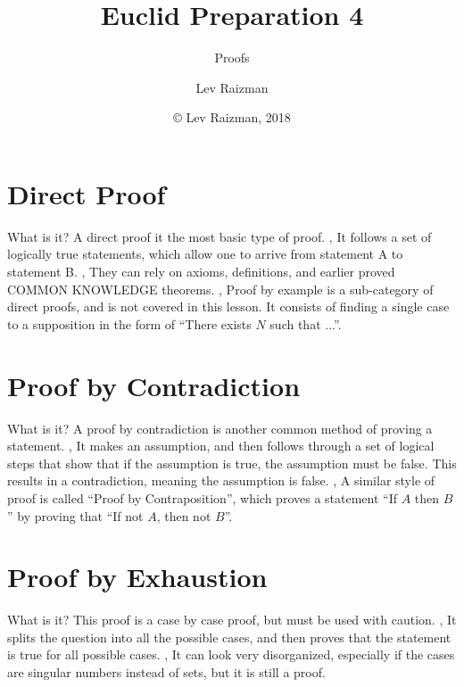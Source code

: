 

\usepackage{adjustbox}
\usepackage{wrapfig}
\usepackage{textpos}
\usepackage{tikz}
\usepackage{tkz-euclide}
\usetikzlibrary{angles,quotes}

\title{Euclid Preparation 4}
\subtitle{Proofs}
\author{Lev Raizman}
\date{\copyright{} Lev Raizman, 2018}


	\frame{\titlepage}
	\section{Direct Proof}
	\begin{namedframe}{What is it?}
		A direct proof it the most basic type of proof.
		\sep
		It follows a set of logically true statements, which allow one to arrive from statement A to statement B.
		\sep
		They can rely on axioms, definitions, and earlier proved COMMON KNOWLEDGE theorems.
		\sep
		Proof by example is a sub-category of direct proofs, and is not covered in this lesson. It consists of finding a single case to a supposition in the form of ``There exists $N$ such that ...''.
	\end{namedframe}
	
	
	\section{Proof by Contradiction}
	\begin{namedframe}{What is it?}
		A proof by contradiction is another common method of proving a statement.
		\sep
		It makes an assumption, and then follows through a set of logical steps that show that if the assumption is true, the assumption must be false. This results in a contradiction, meaning the assumption is false.
		\sep
		A similar style of proof is called ``Proof by Contraposition'', which proves a statement ``If $A$ then $B$'' by proving that ``If not $A$, then not $B$''.
	\end{namedframe}
	
	\section{Proof by Exhaustion}
	\begin{namedframe}{What is it?}
		This proof is a case by case proof, but must be used with caution.
		\sep
		It splits the question into all the possible cases, and then proves that the statement is true for all possible cases.
		\sep
		It can look very disorganized, especially if the cases are singular numbers instead of sets, but it is still a proof.
	\end{namedframe}
	
